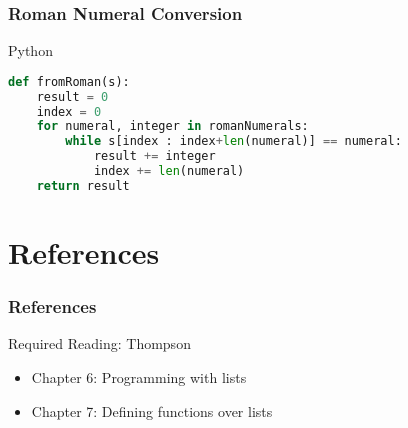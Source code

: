 \documentclass[dvipsnames]{beamer}
\theoremstyle{plain}
\begin{document}
\begin{frame}[fragile]
  \frametitle{Roman Numeral Conversion}

  \begin{exampleblock}{Python}
    \begin{lstlisting}[language=Python]
def fromRoman(s):
    result = 0
    index = 0
    for numeral, integer in romanNumerals:
        while s[index : index+len(numeral)] == numeral:
            result += integer
            index += len(numeral)
    return result
    \end{lstlisting}
  \end{exampleblock}
\end{frame}

\section*{References}

\begin{frame}
  \frametitle{References}

  \begin{block}{Required Reading: Thompson}
    \begin{itemize}
      \item Chapter 6: \alert{Programming with lists}
      \item Chapter 7: \alert{Defining functions over lists}
    \end{itemize}
  \end{block}
\end{frame}
\end{document}
